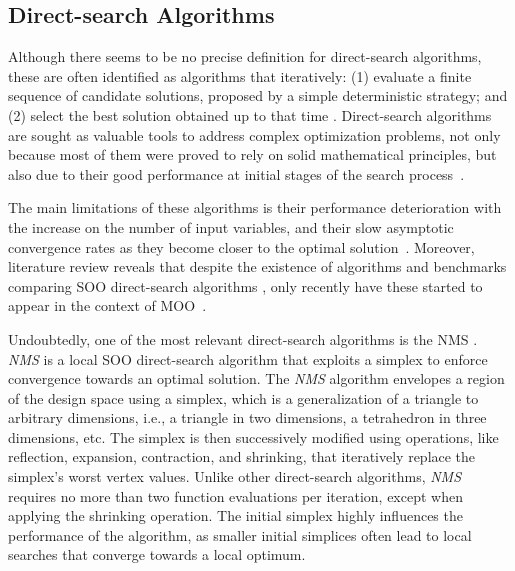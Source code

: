 	\subsection{Direct-search Algorithms}
	\label{ssec:direct-search}
	
	Although there seems to be no precise definition for direct-search algorithms, these are often identified as algorithms that iteratively: (1) evaluate a finite sequence of candidate solutions, proposed by a simple deterministic strategy; and (2) select the best solution obtained up to that time \cite{Conn2009}. Direct-search algorithms are sought as valuable tools to address complex optimization problems, not only because most of them were proved to rely on solid mathematical principles, but also due to their good performance at initial stages of the search process~\cite{Rios2013}. 
	
	The main limitations of these algorithms is their performance deterioration with the increase on the number of input variables, and their slow asymptotic convergence rates as they become closer to the optimal solution~\cite{Kolda2003}. Moreover, literature review reveals that despite the existence of algorithms and benchmarks comparing \ac{SOO} direct-search algorithms \cite{Waibel2018}, only recently have these started to appear in the context of \ac{MOO}~\cite{Custodio2010,Custodio2018}. 
	
	Undoubtedly, one of the most relevant direct-search algorithms is the \ac{NMS} \cite{Nelder1964}. \textit{\ac{NMS}} is a local \ac{SOO} direct-search algorithm that exploits a simplex to enforce convergence towards an optimal solution. The \textit{\ac{NMS}} algorithm envelopes a region of the design space using a simplex, which is a generalization of a triangle to arbitrary dimensions, i.e., a triangle in two dimensions, a tetrahedron in three dimensions, etc. The simplex is then successively modified using operations, like reflection, expansion, contraction, and shrinking, that iteratively replace the simplex's worst vertex values. %
	Unlike other direct-search algorithms, \textit{\ac{NMS}} requires no more than two function evaluations per iteration, except when applying the shrinking operation. The initial simplex highly influences the performance of the algorithm, as smaller initial simplices often lead to local searches that converge towards a local optimum.
	
